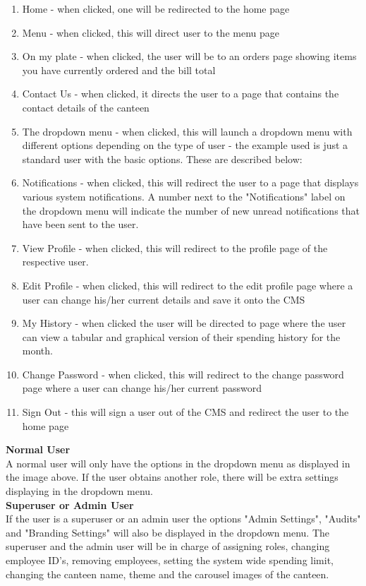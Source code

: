 \documentclass[a4paper,12pt]{report}
\begin{document}
\begin{enumerate}
\item Home -  when clicked, one will be redirected to the home page
\item Menu - when clicked, this will direct user to the menu page
\item On my plate -  when clicked, the user will be to an orders page showing items you have currently ordered and the bill total
\item Contact Us - when clicked, it directs the user to a page that contains the contact details of the canteen 
\item The dropdown menu - when clicked, this will launch a dropdown menu with different options depending on the type of user - the example used is just a standard user with the basic options. These are described below:
\item Notifications -  when clicked, this will redirect the user to a page that displays various system notifications. A number next to the "Notifications" label on the dropdown menu will indicate the number of new unread notifications that have been sent to the user.
\item View Profile - when clicked, this will redirect to the profile page of the respective user.
\item Edit Profile - when clicked, this will redirect to the edit profile page where a user can change his/her current details and save it onto the CMS
\item My History - when clicked the user will be directed to page where the user can view a tabular and graphical version of their spending history for the month.
\item Change Password - when clicked, this will redirect to the change password page where a user can change his/her current password
\item Sign Out  - this will sign a user out of the CMS and redirect the user to the home page
\end{enumerate}

\textbf{Normal User}\\
A normal user will only have the options in the dropdown menu as displayed in the image above. If the user obtains another role, there will be extra settings displaying in the dropdown menu. \\

\textbf{Superuser or Admin User}\\
If the user is a superuser or an admin user the options "Admin Settings", "Audits" and "Branding Settings" will also be displayed in the dropdown menu. The superuser and the admin user will be in charge of assigning roles, changing employee ID's, removing employees, setting the system wide spending limit, changing the canteen name, theme and the carousel images of the canteen.  \\
\end{document}
